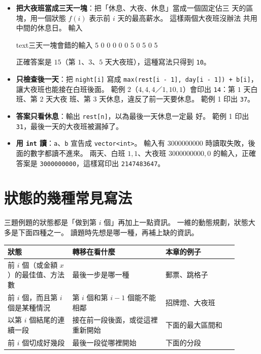 \begin{itemize}
\item \textbf{把大夜班當成三天一塊}：把「休息、大夜、休息」當成一個固定佔三
天的區塊，用一個狀態 $f(i)$ 表示前 $i$ 天的最高薪水。 這樣兩個大夜班沒辦法
共用中間的休息日。 輸入
\begin{code}{text}{三天一塊會錯的輸入}
5
0 0 0 0 0
5 0 5 0 5
\end{code}
正確答案是 $15$（第 $1$、$3$、$5$ 天大夜班），這種寫法只得到 \texttt{10}。
\item \textbf{只檢查後一天}：把 \texttt{night[i]} 寫成
\texttt{max(rest[i - 1], day[i - 1]) + b[i]}，讓大夜班也能接在白班後面。 範例
2（$4, 4, 4$／$1, 10, 1$）會印出 \texttt{14}：第 $1$ 天白班、第 $2$ 天大夜
班、第 $3$ 天休息，違反了前一天要休息。 範例 1 印出 \texttt{37}。
\item \textbf{答案只看休息}：輸出 \texttt{rest[n]}，以為最後一天休息一定最
好。 範例 1 印出 \texttt{31}，最後一天的大夜班被漏掉了。
\item \textbf{用 \texttt{int} 讀}：\texttt{a}、\texttt{b} 宣告成
\texttt{vector<int>}。 輸入有 $3000000000$ 時讀取失敗，後面的數字都讀不進來。
兩天、白班 $1, 1$、大夜班 $3000000000, 0$ 的輸入，正確答案是
\texttt{3000000000}，這樣寫印出 \texttt{2147483647}。
\end{itemize}

\section{狀態的幾種常見寫法}
\label{sec:dp1-shapes}

三題例題的狀態都是「做到第 $i$ 個」再加上一點資訊。 一維的動態規劃，狀態大
多是下面四種之一。 讀題時先想是哪一種，再補上缺的資訊。

\begin{center}
\begin{tabular}{p{0.25\linewidth}p{0.36\linewidth}p{0.29\linewidth}}
\toprule
狀態 & 轉移在看什麼 & 本章的例子 \\
\midrule
前 $i$ 個（或金額 $x$）的最佳值、方法數 & 最後一步是哪一種 & 郵票、跳格子 \\
前 $i$ 個，而且第 $i$ 個是某種情況 & 第 $i$ 個和第 $i - 1$ 個能不能相鄰 & 招牌燈、大夜班 \\
以第 $i$ 個結尾的連續一段 & 接在前一段後面，或從這裡重新開始 & 下面的最大區間和 \\
前 $i$ 個切成好幾段 & 最後一段從哪裡開始 & 下面的分段 \\
\bottomrule
\end{tabular}
\end{center}

